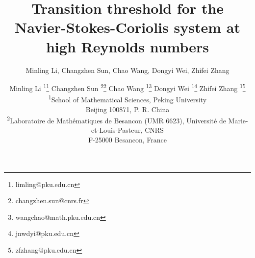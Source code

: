 \documentclass[11pt,reqno]{article}
\numberwithin{equation}{section}
\begin{document}
	
	\title{Transition threshold for the Navier-Stokes-Coriolis system at high Reynolds numbers}
 
	\author{Minling Li, Changzhen Sun, Chao Wang, Dongyi Wei, Zhifei Zhang}
	\author{Minling Li \textsuperscript{1}\thanks{limling@pku.edu.cn}
		\quad Changzhen Sun \textsuperscript{2}\thanks{changzhen.sun@cnrs.fr}
		\quad Chao Wang \textsuperscript{1}\thanks{wangchao@math.pku.edu.cn} 
		\quad Dongyi Wei
\textsuperscript{1}\thanks{jnwdyi@pku.edu.cn} 
		\quad Zhifei Zhang \textsuperscript{1}\thanks{zfzhang@pku.edu.cn}\\[10pt]
		\footnotesize\textsuperscript{1}{School of Mathematical Sciences, Peking University}\\
		\footnotesize {Beijing 100871, P. R. China}\\
		\footnotesize\textsuperscript{2}{Laboratoire de Math\'ematiques de Besancon (UMR 6623),
			Universit\'e de Marie-et-Louis-Pasteur, CNRS}\\
		\footnotesize {F-25000 Besancon, France}\\
		[5pt]}
 
	
	\date{}
	
	
	\maketitle
	
	
	
\end{document}
